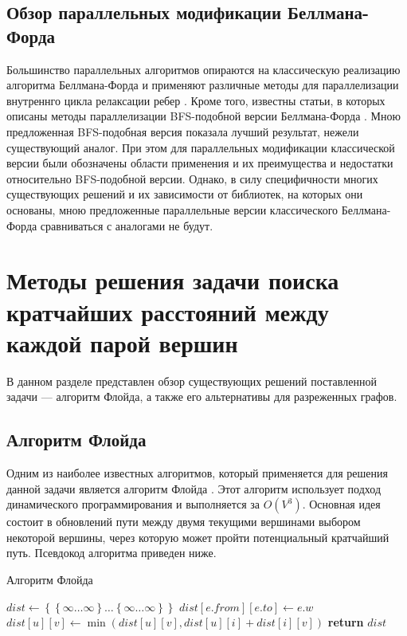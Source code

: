 \FloatBarrier
\subsection{Обзор параллельных модификации Беллмана-Форда}

Большинство параллельных алгоритмов опираются на классическую реализацию алгоритма Беллмана-Форда и применяют различные методы для параллелизации внутреннго цикла релаксации ребер \cite{COHEN}\cite{GAURAV}. Кроме того, известны статьи, в которых описаны методы параллелизации BFS-подобной версии Беллмана-Форда \cite{LIGRA}. Мною предложенная BFS-подобная версия показала лучший результат, нежели существующий аналог. При этом для параллельных модификации классической версии были обозначены области применения и их преимущества и недостатки относительно BFS-подобной версии. Однако, в силу специфичности многих существующих решений и их зависимости от библиотек, на которых они основаны, мною предложенные параллельные версии классического Беллмана-Форда сравниваться с аналогами не будут. 


\FloatBarrier
\section{Методы решения задачи поиска кратчайших расстояний между каждой парой вершин}
В данном разделе представлен обзор существующих решений поставленной задачи --- алгоритм Флойда, а также его альтернативы для разреженных графов.
\subsection{Алгоритм Флойда}
Одним из наиболее известных алгоритмов, который применяется для решения данной задачи является алгоритм Флойда \cite{CORMEN}. Этот алгоритм использует подход динамического программирования и выполняется за $O(V^3)$. Основная идея состоит в обновлений пути между двумя текущими вершинами выбором некоторой вершины, через которую может пройти потенциальный кратчайший путь. Псевдокод алгоритма приведен ниже. 

\FloatBarrier
\begin{algorithm}
\caption{Алгоритм Флойда}\label{floyd}
\begin{algorithmic}[1]
\State $dist\gets \left\{ {   \left\{ {\infty \ldots \infty}\right\}  \ldots \left\{ {\infty \ldots \infty}\right\} }\right\}$
	\State $dist[e.from][e.to] \gets e.w$
\EndFor 
\State
{}
			\State $dist[u][v] \gets \min(dist[u][v], dist[u][i] + dist[i][v])$
		\EndFor
	\EndFor
\EndFor
\State \textbf{return} $dist$
\EndProcedure
\end{algorithmic}
\end{algorithm}

